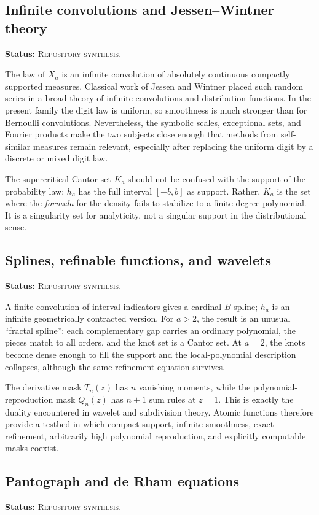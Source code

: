 \documentclass[11pt,oneside]{article}
\theoremstyle{definition}
\theoremstyle{remark}
\newcommand{\RepoStatus}{\textcolor{RepoOlive}{\textsc{Repository synthesis}}}
\newcommand{\status}[1]{\par\smallskip\noindent\textbf{Status:} #1.\par\smallskip}
\begin{document}
\subsection{Infinite convolutions and Jessen--Wintner theory}
\status{\RepoStatus}

The law of \(X_a\) is an infinite convolution of absolutely continuous compactly supported measures.  Classical work of Jessen and Wintner placed such random series in a broad theory of infinite convolutions and distribution functions.  In the present family the digit law is uniform, so smoothness is much stronger than for Bernoulli convolutions.  Nevertheless, the symbolic scales, exceptional sets, and Fourier products make the two subjects close enough that methods from self-similar measures remain relevant, especially after replacing the uniform digit by a discrete or mixed digit law.

The supercritical Cantor set \(K_a\) should not be confused with the support of the probability law: \(h_a\) has the full interval \([-b,b]\) as support.  Rather, \(K_a\) is the set where the \emph{formula} for the density fails to stabilize to a finite-degree polynomial.  It is a singularity set for analyticity, not a singular support in the distributional sense.

\subsection{Splines, refinable functions, and wavelets}
\status{\RepoStatus}

A finite convolution of interval indicators gives a cardinal \(B\)-spline; \(h_a\) is an infinite geometrically contracted version.  For \(a>2\), the result is an unusual ``fractal spline'': each complementary gap carries an ordinary polynomial, the pieces match to all orders, and the knot set is a Cantor set.  At \(a=2\), the knots become dense enough to fill the support and the local-polynomial description collapses, although the same refinement equation survives.

The derivative mask \(T_n(z)\) has \(n\) vanishing moments, while the polynomial-reproduction mask \(Q_n(z)\) has \(n+1\) sum rules at \(z=1\).  This is exactly the duality encountered in wavelet and subdivision theory.  Atomic functions therefore provide a testbed in which compact support, infinite smoothness, exact refinement, arbitrarily high polynomial reproduction, and explicitly computable masks coexist.

\subsection{Pantograph and de Rham equations}
\status{\RepoStatus}
\end{document}
